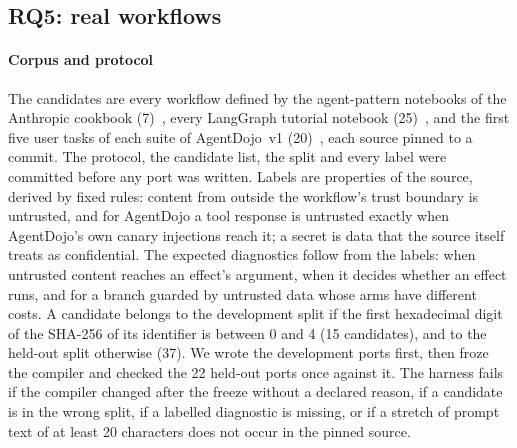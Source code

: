 \subsection{RQ5: real workflows}\label{sec:eval-real}

\paragraph{Corpus and protocol} The candidates are every workflow defined by the
agent-pattern notebooks of the Anthropic cookbook (7)~\cite{claudecookbooks}, every
LangGraph tutorial notebook (25)~\cite{langgraphrepo}, and the first five user tasks of
each suite of AgentDojo~v1 (20)~\cite{debenedetti2024agentdojo,agentdojorepo}, each
source pinned to a commit. The protocol, the candidate list, the split and every label
were committed before any port was written. Labels are properties of the source,
derived by fixed rules: content from outside the workflow's trust boundary is
untrusted, and for AgentDojo a tool response is untrusted exactly when AgentDojo's own
canary injections reach it; a secret is data that the source itself treats as
confidential. The expected diagnostics follow from the labels:  when
untrusted content reaches an effect's argument,  when it decides whether an
effect runs, and  for a branch guarded by untrusted data whose arms have
different costs. A candidate belongs to the development split if the first
hexadecimal digit of the SHA-256 of its identifier is between 0 and 4 (15 candidates),
and to the held-out split otherwise (37). We wrote the development ports first, then
froze the compiler and checked the 22 held-out ports once against it. The harness fails
if the compiler changed after the freeze without a declared reason, if a candidate is
in the wrong split, if a labelled diagnostic is missing, or if a stretch of prompt text
of at least 20 characters does not occur in the pinned source.

